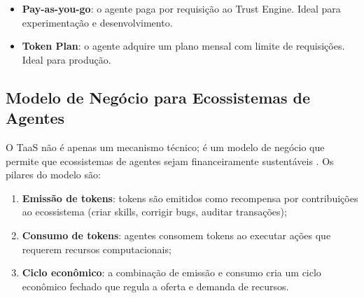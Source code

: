 \begin{itemize}
\item \textbf{Pay-as-you-go}: o agente paga por requisição ao
Trust Engine. Ideal para experimentação e desenvolvimento.
\item \textbf{Token Plan}: o agente adquire um plano mensal com
limite de requisições. Ideal para produção.
\end{itemize}

\begin{table}[htb]
\centering
    \small
\caption{Planos TaaS}
\label{tab:taas-plans}
\end{table}

\subsection{Modelo de Negócio para Ecossistemas de Agentes}

O TaaS não é apenas um mecanismo técnico; é um modelo de negócio
que permite que ecossistemas de agentes sejam financeiramente
sustentáveis \cite{opencode2026ecosystem}. Os pilares do modelo
são:

\begin{enumerate}
\item \textbf{Emissão de tokens}: tokens são emitidos como
recompensa por contribuições ao ecossistema (criar skills,
corrigir bugs, auditar transações);
\item \textbf{Consumo de tokens}: agentes consomem tokens ao
executar ações que requerem recursos computacionais;
\item \textbf{Ciclo econômico}: a combinação de emissão e consumo
cria um ciclo econômico fechado que regula a oferta e demanda
de recursos.
\end{enumerate}

